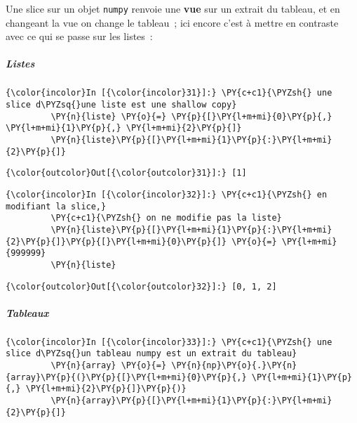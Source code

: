 Une slice sur un objet \texttt{numpy} renvoie une \textbf{vue} sur un
extrait du tableau, et en changeant la vue on change le tableau~; ici
encore c'est à mettre en contraste avec ce qui se passe sur les listes~:

    \hypertarget{listes}{%
\subparagraph{Listes}\label{listes}}

    \begin{Verbatim}[commandchars=\\\{\}]
{\color{incolor}In [{\color{incolor}31}]:} \PY{c+c1}{\PYZsh{} une slice d\PYZsq{}une liste est une shallow copy}
         \PY{n}{liste} \PY{o}{=} \PY{p}{[}\PY{l+m+mi}{0}\PY{p}{,} \PY{l+m+mi}{1}\PY{p}{,} \PY{l+m+mi}{2}\PY{p}{]}
         \PY{n}{liste}\PY{p}{[}\PY{l+m+mi}{1}\PY{p}{:}\PY{l+m+mi}{2}\PY{p}{]}
\end{Verbatim}


\begin{Verbatim}[commandchars=\\\{\}]
{\color{outcolor}Out[{\color{outcolor}31}]:} [1]
\end{Verbatim}
            
    \begin{Verbatim}[commandchars=\\\{\}]
{\color{incolor}In [{\color{incolor}32}]:} \PY{c+c1}{\PYZsh{} en modifiant la slice,}
         \PY{c+c1}{\PYZsh{} on ne modifie pas la liste}
         \PY{n}{liste}\PY{p}{[}\PY{l+m+mi}{1}\PY{p}{:}\PY{l+m+mi}{2}\PY{p}{]}\PY{p}{[}\PY{l+m+mi}{0}\PY{p}{]} \PY{o}{=} \PY{l+m+mi}{999999}
         \PY{n}{liste}
\end{Verbatim}


\begin{Verbatim}[commandchars=\\\{\}]
{\color{outcolor}Out[{\color{outcolor}32}]:} [0, 1, 2]
\end{Verbatim}
            
    \hypertarget{tableaux}{%
\subparagraph{Tableaux}\label{tableaux}}

    \begin{Verbatim}[commandchars=\\\{\}]
{\color{incolor}In [{\color{incolor}33}]:} \PY{c+c1}{\PYZsh{} une slice d\PYZsq{}un tableau numpy est un extrait du tableau}
         \PY{n}{array} \PY{o}{=} \PY{n}{np}\PY{o}{.}\PY{n}{array}\PY{p}{(}\PY{p}{[}\PY{l+m+mi}{0}\PY{p}{,} \PY{l+m+mi}{1}\PY{p}{,} \PY{l+m+mi}{2}\PY{p}{]}\PY{p}{)}
         \PY{n}{array}\PY{p}{[}\PY{l+m+mi}{1}\PY{p}{:}\PY{l+m+mi}{2}\PY{p}{]}
\end{Verbatim}


